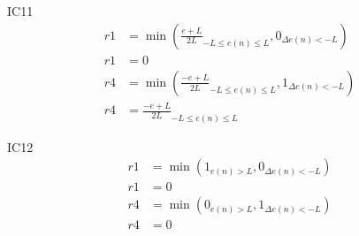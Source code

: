 IC11
\begin{equation}
\begin{split}
    r1&=\min{\left(\frac{e+L}{2L}_{-L\leq e(n)\leq L},0_{\Delta e(n)<-L}\right)}\\
    r1&=0\\
    r4&=\min{\left(\frac{-e+L}{2L}_{-L\leq e(n)\leq L},1_{\Delta e(n)<-L}\right)}\\
    r4&=\frac{-e+L}{2L}_{-L\leq e(n)\leq L}
\end{split}
\end{equation}

IC12
\begin{equation}
\begin{split}
    r1&=\min{\left(1_{e(n)>L},0_{\Delta e(n)<-L}\right)}\\
    r1&=0\\
    r4&=\min{\left(0_{e(n)>L},1_{\Delta e(n)<-L}\right)}\\
    r4&=0
\end{split}
\end{equation}



